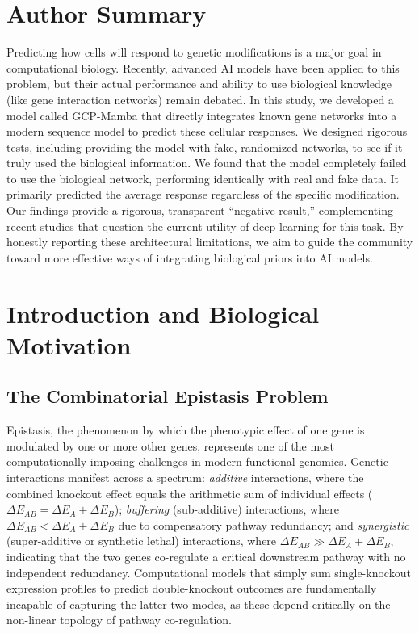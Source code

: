 \documentclass{bioinfo}
\begin{document}
\section*{Author Summary}
Predicting how cells will respond to genetic modifications is a major goal in computational biology. Recently, advanced AI models have been applied to this problem, but their actual performance and ability to use biological knowledge (like gene interaction networks) remain debated. In this study, we developed a model called GCP-Mamba that directly integrates known gene networks into a modern sequence model to predict these cellular responses. We designed rigorous tests, including providing the model with fake, randomized networks, to see if it truly used the biological information. We found that the model completely failed to use the biological network, performing identically with real and fake data. It primarily predicted the average response regardless of the specific modification. Our findings provide a rigorous, transparent ``negative result,'' complementing recent studies that question the current utility of deep learning for this task. By honestly reporting these architectural limitations, we aim to guide the community toward more effective ways of integrating biological priors into AI models.

\section{Introduction and Biological Motivation}
\subsection{The Combinatorial Epistasis Problem}

Epistasis, the phenomenon by which the phenotypic effect of one gene is modulated by one or more other genes, represents one of the most computationally imposing challenges in modern functional genomics. Genetic interactions manifest across a spectrum: \textit{additive} interactions, where the combined knockout effect equals the arithmetic sum of individual effects ($\Delta E_{AB} = \Delta E_A + \Delta E_B$); \textit{buffering} (sub-additive) interactions, where $\Delta E_{AB} < \Delta E_A + \Delta E_B$ due to compensatory pathway redundancy; and \textit{synergistic} (super-additive or synthetic lethal) interactions, where $\Delta E_{AB} \gg \Delta E_A + \Delta E_B$, indicating that the two genes co-regulate a critical downstream pathway with no independent redundancy. Computational models that simply sum single-knockout expression profiles to predict double-knockout outcomes are fundamentally incapable of capturing the latter two modes, as these depend critically on the non-linear topology of pathway co-regulation.
\end{document}
